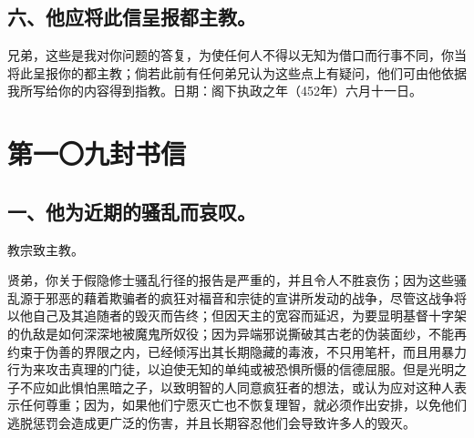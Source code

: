 
\subsection{六、他应将此信呈报都主教。}

兄弟，这些是我对你问题的答复，为使任何人不得以无知为借口而行事不同，你当将此呈报你的都主教；倘若此前有任何弟兄认为这些点上有疑问，他们可由他依据我所写给你的内容得到指教。日期：阁下执政之年（452年）六月十一日。\par



\section{第一〇九封书信}

\par


\subsection{一、他为近期的骚乱而哀叹。}

教宗致主教。\par

贤弟，你关于假隐修士骚乱行径的报告是严重的，并且令人不胜哀伤；因为这些骚乱源于邪恶的藉着欺骗者的疯狂对福音和宗徒的宣讲所发动的战争，尽管这战争将以他自己及其追随者的毁灭而告终；但因天主的宽容而延迟，为要显明基督十字架的仇敌是如何深深地被魔鬼所奴役；因为异端邪说撕破其古老的伪装面纱，不能再约束于伪善的界限之内，已经倾泻出其长期隐藏的毒液，不只用笔杆，而且用暴力行为来攻击真理的门徒，以迫使无知的单纯或被恐惧所慑的信德屈服。但是光明之子不应如此惧怕黑暗之子，以致明智的人同意疯狂者的想法，或认为应对这种人表示任何尊重；因为，如果他们宁愿灭亡也不恢复理智，就必须作出安排，以免他们逃脱惩罚会造成更广泛的伤害，并且长期容忍他们会导致许多人的毁灭。\par

